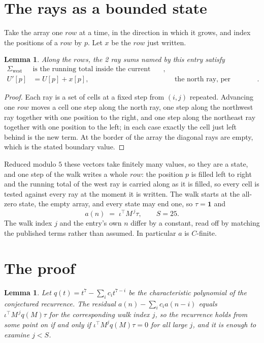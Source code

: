 \documentclass[11pt,a4paper]{article}
\theoremstyle{plain}
\newtheorem{lemma}[theorem]{Lemma}
\theoremstyle{definition}
\begin{document}
\section{The rays as a bounded state}

Take the array one $row$ at a time, in the direction in which it grows, and index the
positions of a $row $ by $p$. Let $x$ be the $row$ just written.

\begin{lemma}\label{lem:rays}
Along the $row$s, the 2 ray sums named by this entry satisfy
\[
\begin{aligned}
\Sigma_{\mathrm{west}}\ &\text{is the running total inside the current row},\\
U'[p]&=U[p]+x[p], &&\text{the north ray, per position} .
\end{aligned}
\]
\end{lemma}

\begin{proof}
Each ray is a set of cells at a fixed step from $(i,j)$ repeated. Advancing one $row$
moves a cell one step along the north ray, one step along the northwest ray together with one
position to the right, and one step along the northeast ray together with one position to the
left; in each case exactly the cell just left behind is the new term. At the border of the
array the diagonal rays are empty, which is the stated boundary value.
\end{proof}

Reduced modulo $5$ these vectors take finitely many values, so they are a state, and one step
of the walk writes a whole $row$: the position $p$ is filled left to right and the
running total of the west ray is carried along as it is filled, so every cell is tested
against every ray at the moment it is written. The walk starts at the all-zero state, the empty
array, and every state may end one, so $\tau=\mathbf{1}$ and
\[
a(n)\;=\;\iota^{\!\top}M^{\,j}\tau ,\qquad S=25.
\]
The walk index $j$ and the entry's own $n$ differ by a constant, read off by matching the
published terms rather than assumed. In particular $a$ is $C$-finite.

\section{The proof}

\begin{lemma}\label{lem:crit}
Let $q(t)=t^{7}-\sum_i c_it^{7-i}$ be the characteristic polynomial of the
conjectured recurrence. The residual $a(n)-\sum_ic_ia(n-i)$ equals
$\iota^{\!\top}M^{\,j}q(M)\tau$ for the corresponding walk index $j$, so the recurrence
holds from some point on if and only if $\iota^{\!\top}M^{j}q(M)\tau=0$ for all large $j$,
and it is enough to examine $j<S$.
\end{lemma}
\end{document}
